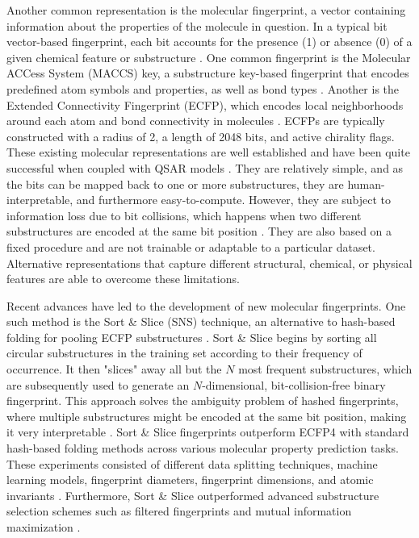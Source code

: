 Another common representation is the molecular fingerprint, a vector containing information about the properties of the molecule in question. In a typical bit vector-based fingerprint, each bit accounts for the presence (1) or absence (0) of a given chemical feature or substructure \citep{Fassio2022}. One common fingerprint is the Molecular ACCess System (MACCS) key, a substructure key-based fingerprint that encodes predefined atom symbols and properties, as well as bond types \citep{Xie2020}. Another is the Extended Connectivity Fingerprint (ECFP), which encodes local neighborhoods around each atom and bond connectivity in molecules \citep{Xie2020}. ECFPs are typically constructed with a radius of 2, a length of 2048 bits, and active chirality flags. These existing molecular representations are well established and have been quite successful when coupled with QSAR models \citep{CortsCiriano2020, Sabando2021}. They are relatively simple, and as the bits can be mapped back to one or more substructures, they are human-interpretable, and furthermore easy-to-compute. However, they are subject to information loss due to bit collisions, which happens when two different substructures are encoded at the same bit position \citep{Fassio2022}. They are also based on a fixed procedure and are not trainable or adaptable to a particular dataset. Alternative representations that capture different structural, chemical, or physical features are able to overcome these limitations. 

Recent advances have led to the development of new molecular fingerprints. One such method is the Sort \& Slice (SNS) technique, an alternative to hash-based folding for pooling ECFP substructures \citep{sns}. Sort \& Slice begins by sorting all circular substructures in the training set according to their frequency of occurrence. It then "slices" away all but the $N$ most frequent substructures, which are subsequently used to generate an $N$-dimensional, bit-collision-free binary fingerprint. This approach solves the ambiguity problem of hashed fingerprints, where multiple substructures might be encoded at the same bit position, making it very interpretable \citep{sns}. Sort \& Slice fingerprints outperform ECFP4 with standard hash-based folding methods across various molecular property prediction tasks. These experiments consisted of different data splitting techniques, machine learning models, fingerprint diameters, fingerprint dimensions, and atomic invariants \citep{sns}. Furthermore, Sort \& Slice outperformed advanced substructure selection schemes such as filtered fingerprints and mutual information maximization \citep{sns}. 


